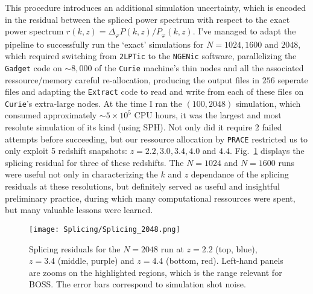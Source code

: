 This procedure introduces an additional simulation uncertainty, which is encoded in the residual between the spliced power spectrum with respect to the exact power spectrum $r(k, z) = \Delta_\varphi P(k, z) / P_\varphi(k, z)$. I've managed to adapt the pipeline to successfully run the `exact' simulations for $N=1024, 1600$ and $2048$, which required switching from \texttt{2LPTic} to the \texttt{NGENic} software, parallelizing the \texttt{Gadget} code on $\sim 8,000$ of the \texttt{Curie} machine's thin nodes and all the associated ressource/memory careful re-allocation, producing the output files in $256$ seperate files and adapting the \texttt{Extract} code to read and write from each of these files on \texttt{Curie}'s extra-large nodes. At the time I ran the $(100, 2048)$ simulation, which consumed approximately $\sim 5 \times 10^5$ CPU hours, it was the largest and most resolute simulation of its kind (using SPH). Not only did it require 2 failed attempts before succeeding, but our ressource allocation by \texttt{PRACE} restricted us to only exploit 5 redshift snapshots: $z=2.2, 3.0, 3.4, 4.0$ and $4.4$. Fig.~\ref{fig:residual_and_zoom} displays the splicing residual for three of these redshifts. The $N=1024$ and $N=1600$ runs were useful not only in characterizing the $k$ and $z$ dependance of the splicing residuals at these resolutions, but definitely served as useful and insightful preliminary practice, during which many computational ressources were spent, but many valuable lessons were learned. \\


\begin{figure}
\begin{center}
\texttt{[image: Splicing/Splicing\_2048.png]}
\caption{Splicing residuals for the $N=2048$ run at $z=2.2$ (top, blue), $z=3.4$ (middle, purple) and $z=4.4$ (bottom, red). Left-hand panels are zooms on the highlighted regions, which is the range relevant for BOSS. The error bars correspond to simulation shot noise.}
\label{fig:residual_and_zoom}
\end{center}
\end{figure}

